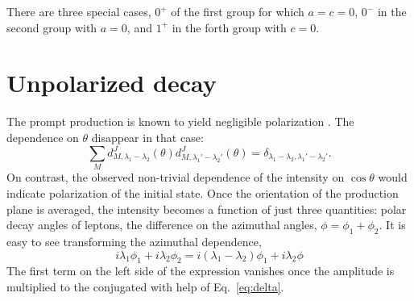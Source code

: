 \documentclass[prd,preprintnumbers,floatfix,
nofootinbib,superscriptaddress]{revtex4}
\newcommand{\I}{\ensuremath{I}}
\newcommand{\II}{\ensuremath{{I\!I}}}
\newcommand{\IV}{\ensuremath{{I\!V}}}
\begin{document}
There are three special cases, $0^+$ of the first group for which $a=c=0$,
$0^-$ in the second group with $a=0$, and $1^+$ in the forth group with $c=0$.


\section{Unpolarized decay}
The prompt production is known to yield negligible polarization \cite{Lambda@ATLAS, Charmoniub, Lambdab}. The dependence on $\theta$ disappear in that case:
\begin{equation} \label{eq:delta}
  \sum_M d_{M,\lambda_1-\lambda_2}^{J}(\theta) d_{M,\lambda_1'-\lambda_2'}^{J}(\theta) = \delta_{\lambda_1-\lambda_2,\lambda_1'-\lambda_2'}.
\end{equation}
On contrast, the observed non-trivial dependence of the intensity on $\cos\theta$
would indicate polarization of the initial state.
Once the orientation of the production plane is averaged, the intensity becomes a function of just three quantities: polar decay angles of leptons, the difference on the azimuthal angles, $\phi = \phi_1+\phi_2$. It is easy to see transforming the azimuthal dependence,
\begin{equation}
i\lambda_1\phi_1+i\lambda_2\phi_2 = i(\lambda_1-\lambda_2)\phi_1+i\lambda_2\phi
\end{equation}
The first term on the left side of the expression vanishes once the amplitude is multiplied
to the conjugated with help of Eq.~\eqref{eq:delta}.
\end{document}
